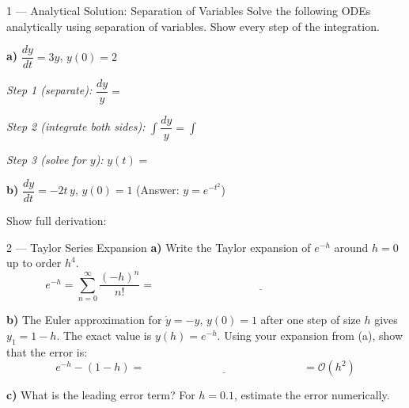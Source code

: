 \documentclass[12pt, a4paper]{article}
\begin{document}
\begin{exercisebox}{1 — Analytical Solution: Separation of Variables}
Solve the following ODEs analytically using separation of variables.
Show every step of the integration.

\textbf{a)} $\dfrac{dy}{dt} = 3y$, \quad $y(0) = 2$

\vspace{0.3em}
\textit{Step 1 (separate):} $\dfrac{dy}{y} = $ \underline{\hspace{3cm}}

\textit{Step 2 (integrate both sides):} $\displaystyle\int\dfrac{dy}{y} = \int$ \underline{\hspace{3cm}}

\textit{Step 3 (solve for $y$):} $y(t) = $ \underline{\hspace{4cm}}

\vspace{1em}
\textbf{b)} $\dfrac{dy}{dt} = -2t\,y$, \quad $y(0) = 1$
\quad (Answer: $y = e^{-t^2}$)

\vspace{0.3em}
Show full derivation:
\end{exercisebox}

\begin{solutionspace}[9cm]
\end{solutionspace}

\begin{exercisebox}{2 — Taylor Series Expansion}
\textbf{a)} Write the Taylor expansion of $e^{-h}$ around $h=0$ up to order $h^4$.
\[
  e^{-h} = \sum_{n=0}^{\infty} \frac{(-h)^n}{n!} = \underline{\hspace{8cm}}
\]

\textbf{b)} The Euler approximation for $\dot{y} = -y$, $y(0)=1$ after one step of size $h$ gives $y_1 = 1-h$.
The exact value is $y(h) = e^{-h}$.
Using your expansion from (a), show that the error is:
\[
  e^{-h} - (1-h) = \underline{\hspace{6cm}} = \mathcal{O}(h^2)
\]

\textbf{c)} What is the leading error term? For $h=0.1$, estimate the error numerically.
\end{exercisebox}

\begin{solutionspace}[8cm]
\end{solutionspace}
\end{document}
